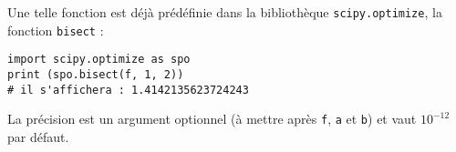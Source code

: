 Une telle fonction est déjà prédéfinie dans la bibliothèque \lstinline{scipy.optimize}, la fonction \lstinline{bisect} : 
\begin{lstlisting}
import scipy.optimize as spo
print (spo.bisect(f, 1, 2)) 
# il s'affichera : 1.4142135623724243
\end{lstlisting}
La précision est un argument optionnel (à mettre après \lstinline{f}, \lstinline{a} et \lstinline{b}) et vaut $10^{-12}$ par défaut.

